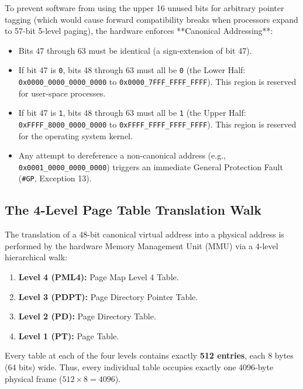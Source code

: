 To prevent software from using the upper 16 unused bits for arbitrary pointer tagging (which would cause forward compatibility breaks when processors expand to 57-bit 5-level paging), the hardware enforces **Canonical Addressing**:
\begin{itemize}
    \item Bits 47 through 63 must be identical (a sign-extension of bit 47).
    \item If bit 47 is \texttt{0}, bits 48 through 63 must all be \texttt{0} (the Lower Half: \texttt{0x0000\_0000\_0000\_0000} to \texttt{0x0000\_7FFF\_FFFF\_FFFF}). This region is reserved for user-space processes.
    \item If bit 47 is \texttt{1}, bits 48 through 63 must all be \texttt{1} (the Upper Half: \texttt{0xFFFF\_8000\_0000\_0000} to \texttt{0xFFFF\_FFFF\_FFFF\_FFFF}). This region is reserved for the operating system kernel.
    \item Any attempt to dereference a non-canonical address (e.g., \texttt{0x0001\_0000\_0000\_0000}) triggers an immediate General Protection Fault (\texttt{\#GP}, Exception 13).
\end{itemize}

\subsection{The 4-Level Page Table Translation Walk}
The translation of a 48-bit canonical virtual address into a physical address is performed by the hardware Memory Management Unit (MMU) via a 4-level hierarchical walk:
\begin{enumerate}
    \item \textbf{Level 4 (PML4):} Page Map Level 4 Table.
    \item \textbf{Level 3 (PDPT):} Page Directory Pointer Table.
    \item \textbf{Level 2 (PD):} Page Directory Table.
    \item \textbf{Level 1 (PT):} Page Table.
\end{enumerate}

Every table at each of the four levels contains exactly \textbf{512 entries}, each 8 bytes (64 bits) wide. Thus, every individual table occupies exactly one 4096-byte physical frame ($512 \times 8 = 4096$).

